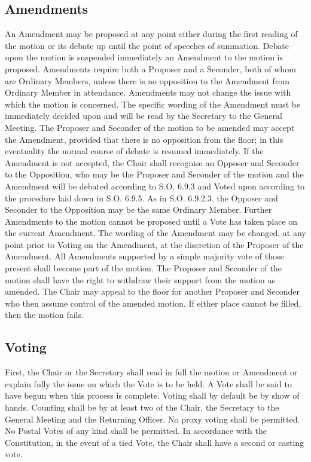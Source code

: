 \subsection{Amendments}
\npara An Amendment may be proposed at any point either during the first reading of the motion or its debate up until the point of speeches of summation.
\npara Debate upon the motion is suspended immediately an Amendment to the motion is proposed.
\npara Amendments require both a Proposer and a Seconder, both of whom are Ordinary Members, unless there is no opposition to the Amendment from Ordinary Member in attendance.
\npara Amendments may not change the issue with which the motion is concerned.
\npara The specific wording of the Amendment must be immediately decided upon and will be read by the Secretary to the General Meeting.
\npara The Proposer and Seconder of the motion to be amended may accept the Amendment, provided that there is no opposition from the floor; in this eventuality the normal course of debate is resumed immediately.
\npara If the Amendment is not accepted, the Chair shall recognise an Opposer and Seconder to the Opposition, who may be the Proposer and Seconder of the motion and the Amendment will be debated according to S.O. 6.9.3 and Voted upon according to the procedure laid down in S.O. 6.9.5.  As in S.O. 6.9.2.3. the Opposer and Seconder to the Opposition may be the same Ordinary Member.
\npara Further Amendments to the motion cannot be proposed until a Vote has taken place on the current Amendment.
\npara The wording of the Amendment may be changed, at any point prior to Voting on the Amendment, at the discretion of the Proposer of the Amendment.
\npara All Amendments supported by a simple majority vote of those present shall become part of the motion.
\npara The Proposer and Seconder of the motion shall have the right to withdraw their support from the motion as amended. The Chair may appeal to the floor for another Proposer and Seconder who then assume control of the amended motion.  If either place cannot be filled, then the motion fails.
\subsection{Voting}
\npara First, the Chair or the Secretary shall read in full the motion or Amendment or explain fully the issue on which the Vote is to be held. A Vote shall be said to have begun when this process is complete.
\npara Voting shall by default be by show of hands.
\npara Counting shall be by at least two of the Chair, the Secretary to the General Meeting and the Returning Officer.
\npara No proxy voting shall be permitted.
\npara No Postal Votes of any kind shall be permitted.
\npara In accordance with the Constitution, in the event of a tied Vote, the Chair shall have a second or casting vote.
